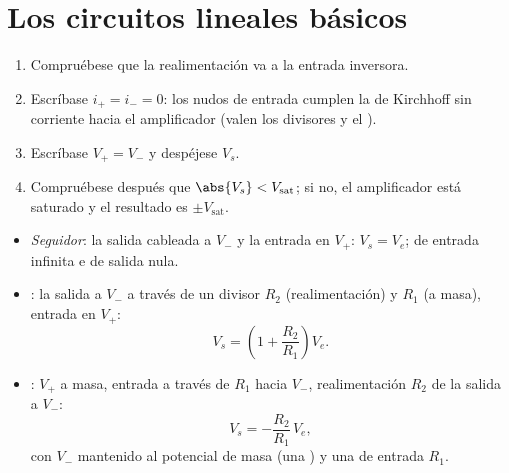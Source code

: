 \section{Los circuitos lineales básicos}

\begin{method}\label{met:b1:operational-amplifier:method}
\begin{enumerate}
  \item Compruébese que la realimentación va a la entrada inversora.
  \item Escríbase $i_+ = i_- = 0$: los nudos de entrada cumplen la  de Kirchhoff sin corriente hacia el amplificador (valen
        los divisores y el ).
  \item Escríbase $V_+ = V_-$ y despéjese $V_s$.
  \item Compruébese después que $\abs{V_s} < V_{\mathrm{sat}}$; si no, el
        amplificador está saturado y el resultado es $\pm V_{\mathrm{sat}}$.
\end{enumerate}
\end{method}

\begin{proposition}\label{prop:b1:operational-amplifier:basic}
\begin{itemize}
  \item \emph{Seguidor}: la salida cableada a $V_-$ y la entrada en $V_+$:
        $V_s = V_e$;  de entrada infinita e  de salida
        nula.
  \item \emph{}: la salida a $V_-$ a través de un
        divisor $R_2$ (realimentación) y $R_1$ (a masa), entrada en $V_+$:
        \[
        V_s = \left(1 + \frac{R_2}{R_1}\right)V_e .
        \]
  \item \emph{}: $V_+$ a masa, entrada a través de
        $R_1$ hacia $V_-$, realimentación $R_2$ de la salida a $V_-$:
        \[
        V_s = -\frac{R_2}{R_1}\,V_e ,
        \]
        con $V_-$ mantenido al potencial de masa (una \emph{})
        y una  de entrada $R_1$.
\end{itemize}
\end{proposition}

